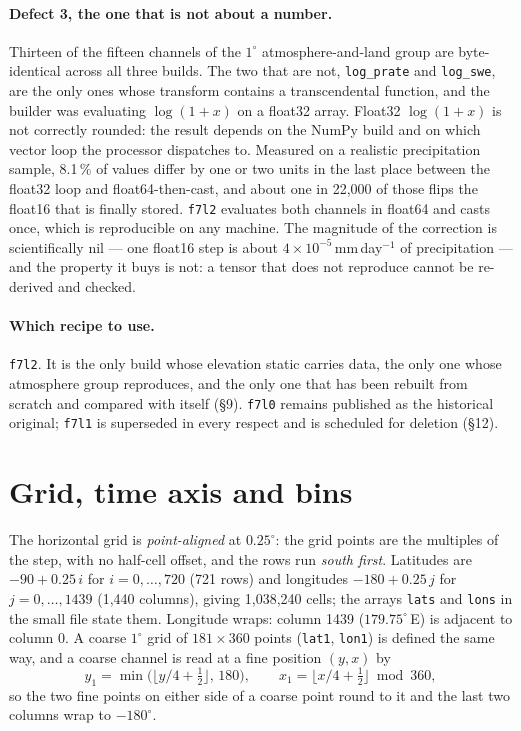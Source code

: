 \documentclass[10pt]{article}
\newcommand{\code}[1]{\texttt{#1}}
\begin{document}
\paragraph{Defect 3, the one that is not about a number.} Thirteen of the
fifteen channels of the $1^\circ$ atmosphere-and-land group are byte-identical
across all three builds. The two that are not, \code{log\_prate} and
\code{log\_swe}, are the only ones whose transform contains a transcendental
function, and the builder was evaluating $\log(1+x)$ on a float32 array.
Float32 $\log(1+x)$ is not correctly rounded: the result depends on the NumPy
build and on which vector loop the processor dispatches to. Measured on a
realistic precipitation sample, 8.1\,\% of values differ by one or two units in
the last place between the float32 loop and float64-then-cast, and about one in
22,000 of those flips the float16 that is finally stored. \code{f7l2}
evaluates both channels in float64 and casts once, which is reproducible on any
machine. The magnitude of the correction is scientifically nil --- one float16
step is about $4\times10^{-5}$\,mm\,day$^{-1}$ of precipitation --- and the
property it buys is not: a tensor that does not reproduce cannot be re-derived
and checked.

\paragraph{Which recipe to use.} \code{f7l2}. It is the only build whose
elevation static carries data, the only one whose atmosphere group reproduces,
and the only one that has been rebuilt from scratch and compared with itself
(\S9). \code{f7l0} remains published as the historical original; \code{f7l1}
is superseded in every respect and is scheduled for deletion (\S12).

\section{Grid, time axis and bins}

The horizontal grid is \emph{point-aligned} at $0.25^\circ$: the grid points
are the multiples of the step, with no half-cell offset, and the rows run
\emph{south first}. Latitudes are $-90 + 0.25\,i$ for $i = 0,\dots,720$ (721
rows) and longitudes $-180 + 0.25\,j$ for $j = 0,\dots,1439$ (1,440 columns),
giving 1,038,240 cells; the arrays \code{lats} and \code{lons} in the small
file state them. Longitude wraps: column 1439 ($179.75^\circ$\,E) is adjacent
to column 0. A coarse $1^\circ$ grid of $181\times360$ points (\code{lat1},
\code{lon1}) is defined the same way, and a coarse channel is read at a fine
position $(y,x)$ by
\begin{equation}
y_1 = \min\!\big(\lfloor y/4 + \tfrac12\rfloor,\,180\big),\qquad
x_1 = \lfloor x/4 + \tfrac12\rfloor \bmod 360 ,
\end{equation}
so the two fine points on either side of a coarse point round to it and the
last two columns wrap to $-180^\circ$.
\end{document}
